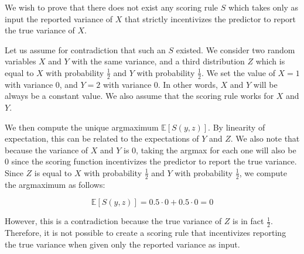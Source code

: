 \documentclass[12pt]{article}%
\begin{document}
We wish to prove that there does not exist any scoring rule $S$ which takes only as input the reported variance of $X$ that strictly incentivizes the predictor to report the true variance of $X$.

Let us assume for contradiction that such an $S$ existed. We consider two random variables $X$ and $Y$ with the same variance, and a third distribution $Z$ which is equal to $X$ with probability $\frac{1}{2}$ and $Y$ with probability $\frac{1}{2}$. We set the value of $X = 1$ with variance 0, and $Y = 2$ with variance 0. In other words, $X$ and $Y$ will be always be a constant value. We also assume that the scoring rule works for $X$ and $Y$.

We then compute the unique argmaximum $\mathbb{E}[S(y, z)]$. By linearity of expectation, this can be related to the expectations of $Y$ and $Z$. We also note that because the variance of $X$ and $Y$ is 0, taking the argmax for each one will also be 0 since the scoring function incentivizes the predictor to report the true variance. Since $Z$ is equal to $X$ with probability $\frac{1}{2}$ and $Y$ with probability $\frac{1}{2}$, we compute the argmaximum as follows:

\begin{equation}
\mathbb{E}[S(y, z)] = 0.5 \cdot 0 + 0.5 \cdot 0 = 0
\end{equation}

However, this is a contradiction because the true variance of $Z$ is in fact $\frac{1}{2}$. Therefore, it is not possible to create a scoring rule that incentivizes reporting the true variance when given only the reported variance as input.
\end{document}

